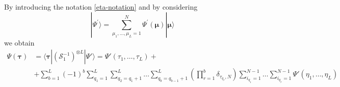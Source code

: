 \documentclass[10pt]{article}
\numberwithin{equation}{section}
\numberwithin{equation}{subsection}
\begin{document}
\begin{comment}
			We generalize this tensor product to an arbitrary number of sites $L$ obtaining the matrix $\mathcal{F}$. We write the expression of a fixed raw with indices $\tau_{1},\ldots,\tau_{L}\in \{1,\ldots,N\}$ as 
			\begin{equation}
				\begin{split}
					\mathcal{F}_{\tau_{1},\ldots,\tau_{L}}&=e_{\tau_{1},\ldots,\tau_{L}}^{\tau_{1},\ldots,\tau_{L}}
					\\&
					+\sum_{b=1}^{L}(-1)^{b}\sum_{q_{1}=1}^{L}\sum_{q_{2}=q_{1}+1}^{L}\ldots\sum_{q_{b}=q_{b-1}+1}^{L}\left(\prod_{r=1}^{b}\delta_{s_{q_{r}},1}\right)\sum_{r=1}^{b}\sum_{d_{q_{r}}=2}^{N}e_{\ldots,\tau_{x},\ldots,\underbrace{1}_{q_{r}},\ldots}^{\ldots,\tau_{x},\ldots,\,d_{q_{r}}\,,\ldots}
				\end{split}
			\end{equation}
			where $e_{\ldots,\tau_{x},\ldots,\underbrace{1}_{q_{r}},\ldots}^{\ldots,\tau_{x},\ldots,\,d_{q_{r}}\,,\ldots}$ denotes the matrix $e_{\tau_{1},\ldots,\tau_{L}}^{\tau_{1},\ldots,\tau_{L}}$ where the subscripts $\tau_{q_{1}},\ldots,\tau_{q_{b}}$ have been replaced by "1" and the superscripts $\tau_{q_{1}},\ldots,\tau_{q_{b}}$ have been replaced by $d_{q_{1}},\ldots,d_{q_{b}}$. \\
		The product $\left(\mathcal{S}_{1}^{-1}\right)^{\otimes L}|\Psi^{'}\rangle$ gives a vector whose component are denoted by $\Psi(\bm{\tau})$. 
		To find this elements we need to fix the rows correspondent to $\bm{\tau}$. Consider a string $\bm{\tau}=(\tau_{1},\ldots,\tau_{L})$ with $\tau_{1},\ldots,\tau_{L}\in \{1,\ldots,N\}$, then the corresponding row of the vector $\left(\mathcal{S}_{1}^{-1}\right)^{\otimes L}|\Psi^{'}\rangle$ reads
		\end{comment}
	By introducing the notation \eqref{eta-notation} and by considering 
	\begin{equation}
		|\Psi^{'}\rangle=\sum_{\mu_{1},\ldots,\mu_{L}=1}^{N}\Psi^{'}(\bm{\mu})|\bm{\mu}\rangle
	\end{equation} we obtain  
		\begin{equation}
			\begin{split}
				\Psi(\bm{\tau}) &=\langle\bm{\tau}|\left(\mathcal{S}_{1}^{-1}\right)^{\otimes L}|\Psi{'}\rangle=\Psi{'}(\tau_{1},\ldots,\tau_{L})+ 
				\\&
				+\sum_{b=1}^{L}(-1)^{b}\sum_{q_{1}=1}^{L}\sum_{q_{2}=q_{1}+1}^{L}\ldots\sum_{q_{b}=q_{b-1}+1}^{L}\left(\prod_{r=1}^{b}\delta_{\tau_{q_{r}},N}\right)\sum_{i_{q_{1}}=1}^{N-1}\ldots\sum_{i_{q_{r}}=1}^{N-1}\Psi{'}(\eta_{1},\ldots,\eta_{L})
			\end{split}
		\end{equation}
\end{document}
